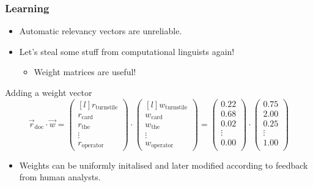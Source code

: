 \documentclass{beamer}
\begin{document}
\begin{frame}
\frametitle{Learning}
\begin{itemize}
\item Automatic relevancy vectors are unreliable.
\item Let's steal some stuff from computational linguists again!
  \begin{itemize}
  \item Weight matrices are useful!
  \end{itemize}
\end{itemize}

\begin{block}{Adding a weight vector}
\[\vec{r}_\text{doc}\cdot \vec w=
\begin{pmatrix*}[l]
  r_\text{turnstile}\\
  r_\text{card}\\
  r_\text{the}\\
  \vdots\\
  r_\text{operator}
\end{pmatrix*}
\cdot
\begin{pmatrix*}[l]
  w_\text{turnstile}\\
  w_\text{card}\\
  w_\text{the}\\
  \vdots\\
  w_\text{operator}
\end{pmatrix*}
=
\begin{pmatrix}
  0.22\\
  0.68\\
  0.02\\
  \vdots\\
  0.00\\
\end{pmatrix}
\cdot
\begin{pmatrix}
  0.75\\
  2.00\\
  0.25\\
  \vdots\\
  1.00\\
\end{pmatrix}
\]
\end{block}

\begin{itemize}
\item Weights can be uniformly initalised and later modified according to feedback from human analysts.
\end{itemize}

\end{frame}
\end{document}

